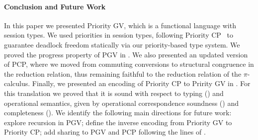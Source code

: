 \documentclass[main.tex]{subfiles}
\begin{document}
\paragraph{Conclusion and Future Work}
In this paper we presented Priority GV, which is a functional language with session types. We used priorities in session types, following Priority CP~\cite{dardhagay18} to guarantee deadlock freedom statically via our priority-based type system. We proved the progress property of PGV in . We also presented an updated version of PCP, where we moved from commuting conversions to structural congruence in the reduction relation, thus remaining faithful to the reduction relation of the $\pi$-calculus. Finally, we presented an encoding of Priority CP to Pririty GV in . For this translation we proved that it is sound with respect to typing () and operational semantics, given by operational correspondence soundness () and completeness ().
We identify the following main directions for future work: explore recursion in PGV; define the inverse encoding from Priority GV to Priority CP; add sharing to PGV and PCP following the lines of \cite{balzerpfenning17}.
\end{document}
